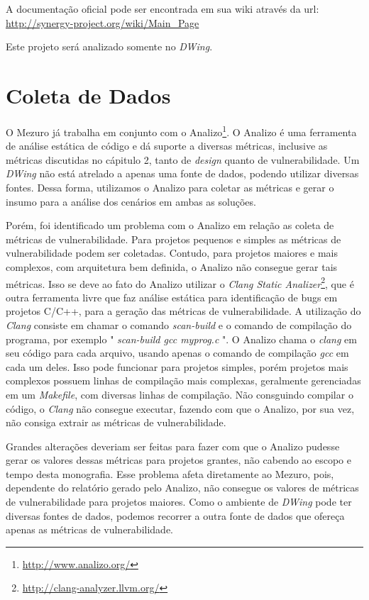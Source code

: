 A documentação oficial pode ser encontrada em sua wiki através da url: \url{http://synergy-project.org/wiki/Main_Page}

Este projeto será analizado somente no \emph{DWing}.

\section{Coleta de Dados}
\label{data-colect}

O Mezuro já trabalha em conjunto com o Analizo\footnote{\url{http://www.analizo.org/}}. O Analizo é uma ferramenta de análise estática de código e dá suporte a diversas métricas, inclusive as métricas discutidas no cápitulo 2, tanto de \emph{design} quanto de vulnerabilidade. Um \emph{DWing} não está atrelado a apenas uma fonte de dados, podendo utilizar diversas fontes. Dessa forma, utilizamos o Analizo para coletar as métricas e gerar o insumo para a análise dos cenários em ambas as soluções.

Porém, foi identificado um problema com o Analizo em relação as coleta de métricas de vulnerabilidade. Para projetos pequenos e simples as métricas de vulnerabilidade podem ser coletadas.  Contudo, para projetos maiores e mais complexos, com arquitetura bem definida, o Analizo não consegue gerar tais métricas. Isso se deve ao fato do Analizo utilizar o \emph{Clang Static Analizer}\footnote{\url{http://clang-analyzer.llvm.org/}}, que é outra ferramenta livre que faz análise estática para identificação de bugs em projetos C/C++, para a geração das métricas de vulnerabilidade. A utilização do \emph{Clang} consiste em chamar o comando \emph{scan-build}  e o comando de compilação do programa, por exemplo " \emph{scan-build gcc myprog.c} ". O Analizo chama o \emph{clang} em seu código para cada arquivo, usando apenas o comando  de compilação \emph{gcc} em cada um deles. Isso pode funcionar para projetos simples, porém projetos mais complexos possuem linhas de compilação mais complexas, geralmente gerenciadas em um \emph{Makefile}, com diversas linhas de compilação. Não consguindo compilar o código, o \emph{Clang} não consegue executar, fazendo com que o Analizo, por sua vez, não consiga extrair as métricas de vulnerabilidade. 

Grandes alterações deveriam ser feitas para fazer com que o Analizo pudesse gerar os valores dessas métricas para projetos grantes, não cabendo ao escopo e tempo desta monografia. Esse problema afeta diretamente ao Mezuro, pois, dependente do relatório gerado pelo Analizo, não consegue os valores de métricas de vulnerabilidade para projetos maiores. Como o ambiente de \emph{DWing} pode ter diversas fontes de dados, podemos recorrer a outra fonte de dados que ofereça apenas as métricas de vulnerabilidade.

